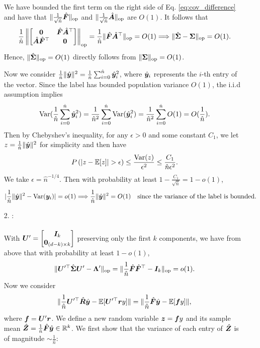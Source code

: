 \begin{enumerate}
We have bounded the first term on the right side of Eq. \ref{eq:cov_difference} and have that $\lVert \frac{1}{\sqrt{\hat{n}}}\hat{{\bm{F}}} \rVert_{\mathrm{op}}$ and $\lVert \frac{1}{\sqrt{\hat{n}}}\hat{{\bm{A}}} \rVert_{\mathrm{op}}$ are $O(1)$. It follows that 
\[
    \frac{1}{\hat{n}}\left\|
    \begin{bmatrix}
        \mathbf{0} & \hat{{\bm{F}}}\hat{{\bm{A}}}^\top \\
        \hat{{\bm{A}}}\hat{{\bm{F}}}^\top & \mathbf{0}
    \end{bmatrix}
    \right\|_{\text{op}} = \frac{1}{\hat{n}}\lVert \hat{{\bm{F}}}\hat{{\bm{A}}}^\top
     \rVert_{\mathrm{op}} = O(1) \Longrightarrow \lVert \hat{{\bm{\Sigma}}} - {\bm{\Sigma}} \rVert_{\mathrm{op}} = O(1). 
\]
Hence, $\lVert \hat{{\bm{\Sigma}}} \rVert_{\mathrm{op}} = O(1)$ directly follows from $\lVert {\bm{\Sigma}} \rVert_{\mathrm{op}} = O(1)$. 

Now we consider $\frac{1}{\hat{n}}\|\hat{{\bm{y}}}\|^2 = \frac{1}{\hat{n}}\sum_{i=0}^{\hat{n}}\hat{{\bm{y}}}_i^2$, where $\hat{{\bm{y}}}_i$ represents the $i$-th entry of the vector. Since the label has bounded population variance $O(1)$, the i.i.d assumption implies
\[
    \mathrm{Var}(\frac{1}{\hat{n}}\sum_{i=0}^{\hat{n}}\hat{{\bm{y}}}_i^2) = \frac{1}{\hat{n}^2}\sum_{i=0}^{\hat{n}}\mathrm{Var}(\hat{{\bm{y}}}_i^2) = \frac{1}{\hat{n}^2}\sum_{i=0}^{\hat{n}}O(1) = O(\frac{1}{\hat{n}}). 
\]
Then by Chebyshev's inequality, for any $\epsilon > 0$ and some constant $C_1$, we let $z = \frac{1}{\hat{n}}\|\hat{{\bm{y}}}\|^2$ for simplicity and then have
\[
P\left(|z- \mathbb{E}[z]| > \epsilon\right) \leq \frac{\mathrm{Var}(z)}{\epsilon^2} \leq \frac{C_1}{\hat{n} \epsilon^2}.  
\]
We take $\epsilon = \hat{n}^{-1/4}$. Then with probability at least $1-\frac{C_1}{\sqrt{\hat{n}}} = 1 - o(1)$, 
\[
    |\frac{1}{\hat{n}}\|\hat{{\bm{y}}}\|^2 - \mathrm{Var}({\bm{y}}_i)| = o(1) \Longrightarrow \frac{1}{\hat{n}}\|\hat{{\bm{y}}}\|^2 = O(1) \quad \text{since the variance of the label is bounded.}
\]
    \item[2.] \conc{}: \\ \\
    With ${\bm{U}}' = \begin{bmatrix}
    {\bm{I}}_k \\ \mathbf{0}_{(d-k) \times k}
\end{bmatrix}$ preserving only the first $k$ components, we have from above that with probability at least $1-o(1)$, 
\[
    \lVert {\bm{U}}'^\top\hat{{\bm{\Sigma}}}{\bm{U}}' - {\bm{\Lambda}}' \rVert_{\mathrm{op}} = \lVert \frac{1}{\hat{n}}\hat{{\bm{F}}}\hat{{\bm{F}}}^\top - {\bm{I}}_k \rVert_{\mathrm{op}} = o(1). 
\] 
Now we consider
\[
    \| \frac{1}{\hat{n}} {\bm{U}}'^\top \hat{{\bm{R}}}\hat{{\bm{y}}} -\mathbb{E}[ {\bm{U}}'^\top{\bm{r}} y]  \| = \| \frac{1}{\hat{n}} \hat{{\bm{F}}}\hat{{\bm{y}}} -\mathbb{E}[ {\bm{f}} y]  \| ,   
\]
where ${\bm{f}} = {\bm{U}}'{\bm{r}}$. We define a new random variable ${\bm{z}} = {\bm{f}} y$ and its sample mean $\hat{{\bm{Z}}} = \frac{1}{\hat{n}} \hat{{\bm{F}}}\hat{{\bm{y}}} \in \mathbb{R}^k$. We first show that the variance of each entry of $\hat{{\bm{Z}}}$ is of magnitude $\sim \frac{1}{\hat{n}}$: 

\end{enumerate}
